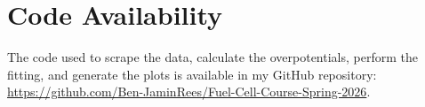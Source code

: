 \documentclass[11pt]{article}
\begin{document}
\section{Code Availability}
The code used to scrape the data, calculate the overpotentials, perform the fitting, and generate the plots is available in my 
GitHub repository: \url{https://github.com/Ben-JaminRees/Fuel-Cell-Course-Spring-2026}.
\end{document}
